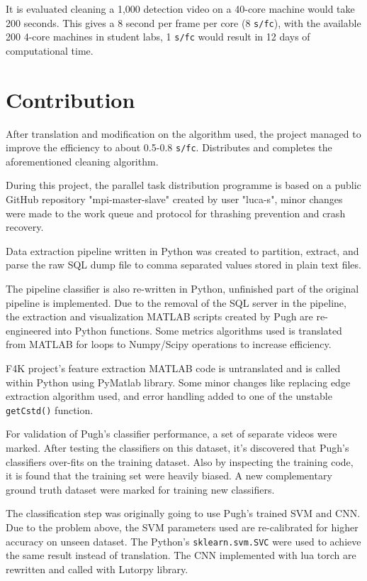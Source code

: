 \documentclass[bsc,logo,twoside,fullspacing,parskip]{infthesis}
\begin{document}
It is evaluated cleaning a 1,000 detection video on a 40-core machine would take 200 seconds.
This gives a 8 second per frame per core (8 {\tt s/fc}), with the available 200 4-core machines in student labs, 1 {\tt s/fc} would result in 12 days of computational time.

\section{Contribution}

After translation and modification on the algorithm used, the project managed to improve the efficiency to about 0.5-0.8 {\tt s/fc}. Distributes and completes the aforementioned cleaning algorithm.

During this project, the parallel task distribution programme is based on a public GitHub repository "mpi-master-slave" created by user "luca-s"\cite{L5}, minor changes were made to the work queue and protocol for thrashing prevention and crash recovery.

Data extraction pipeline written in Python was created to partition, extract, and parse the raw SQL dump file to comma separated values stored in plain text files. 

The pipeline classifier is also re-written in Python, unfinished part of the original pipeline is implemented. 
Due to the removal of the SQL server in the pipeline, the extraction and visualization MATLAB scripts created by Pugh are re-engineered into Python functions. 
Some metrics algorithms used is translated from MATLAB for loops to Numpy/Scipy operations to increase efficiency.

F4K project's feature extraction MATLAB code is untranslated and is called within Python using PyMatlab library. Some minor changes like replacing edge extraction algorithm used, and error handling added to one of the unstable {\tt getCstd()} function. 

For validation of Pugh's classifier performance, a set of separate videos were marked. After testing the classifiers on this dataset, it's discovered that Pugh's classifiers over-fits on the training dataset. Also by inspecting the training code, it is found that the training set were heavily biased. A new complementary ground truth dataset were marked for training new classifiers. 

The classification step was originally going to use Pugh's trained SVM and CNN. Due to the problem above, the SVM parameters used are re-calibrated for higher accuracy on unseen dataset. 
The Python's {\tt sklearn.svm.SVC} were used to achieve the same result instead of translation. The CNN implemented with lua torch are rewritten and called with Lutorpy library.
\end{document}

